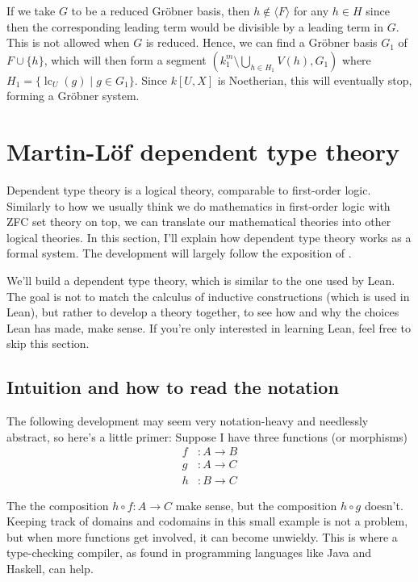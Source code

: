 \documentclass[a4paper, 12pt]{article}
\DeclareMathOperator{\LC}{lc}
\theoremstyle{changedot}
\theoremstyle{changedotbreak}
\theoremstyle{nonumberplain}
\begin{document}
If we take $G$ to be a reduced Gröbner basis, then $h \notin \langle F \rangle$ for any $h \in H$ since then the corresponding leading term would be divisible by a leading term in $G$. This is not allowed when $G$ is reduced. Hence, we can find a Gröbner basis $G_{1}$ of $F \cup \{h\}$, which will then form a segment $(k_{1}^{m} \setminus \bigcup_{h \in H_{1}} V(h), G_{1})$ where $H_{1} = \{\LC_{U}(g) \mid g \in G_{1}\}$. Since $k[U, X]$ is Noetherian, this will eventually stop, forming a Gröbner system.




\section{Martin-Löf dependent type theory}\label{sec:tt}
Dependent type theory is a logical theory, comparable to first-order logic. Similarly to how we usually think we do mathematics in first-order logic with ZFC set theory on top, we can translate our mathematical theories into other logical theories. In this section, I'll explain how dependent type theory works as a formal system. The development will largely follow the exposition of \cite{rijke2022introduction}.

We'll build a dependent type theory, which is similar to the one used by Lean. The goal is not to match the calculus of inductive constructions (which is used in Lean), but rather to develop a theory together, to see how and why the choices Lean has made, make sense. If you're only interested in learning Lean, feel free to skip this section.

\subsection{Intuition and how to read the notation}
The following development may seem very notation-heavy and needlessly abstract, so here's a little primer: Suppose I have three functions (or morphisms)
\begin{align*}
  f &: A \to B \\
  g &: A \to C \\
  h &: B \to C
\end{align*}

The the composition $h \circ f : A \to C$ make sense, but the composition $h \circ g$ doesn't. Keeping track of domains and codomains in this small example is not a problem, but when more functions get involved, it can become unwieldy. This is where a type-checking compiler, as found in programming languages like Java and Haskell, can help.
\end{document}
